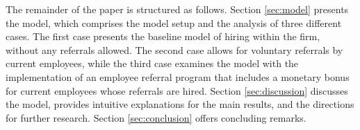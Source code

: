 \documentclass[12pt]{article}
\begin{document}
The remainder of the paper is structured as follows. Section \ref{sec:model} presents the model, which comprises the model setup and the analysis of three different cases. The first case presents the baseline model of hiring within the firm, without any referrals allowed. The second case allows for voluntary referrals by current employees, while the third case examines the model with the implementation of an employee referral program that includes a monetary bonus for current employees whose referrals are hired. Section \ref{sec:discussion} discusses the model, provides intuitive explanations for the main results, and the directions for further research. Section \ref{sec:conclusion} offers concluding remarks.

\end{document}
